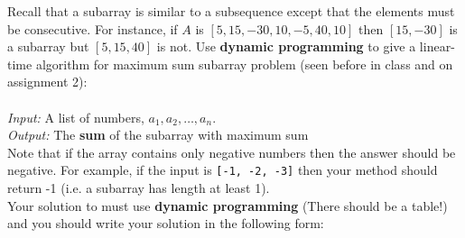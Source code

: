 \documentclass[11pt]{exam}
\begin{document}
\begin{questions}

\question[5]
  Recall that a subarray is similar to a subsequence except that the elements must be consecutive.  For instance, if $A$ is $[5,15,-30,10,-5,40,10]$
  then $[15,-30]$ is a subarray but $[5,15,40]$ is not.  Use {\bf dynamic programming} to give a
  linear-time algorithm for maximum sum subarray problem (seen before in class and on assignment 2):\\\\ 
  \emph{Input:} A list of numbers, $a_1, a_2, \ldots, a_n.$\\ 
  \emph{Output:} The \textbf{sum} of the subarray with maximum sum \\ 
  Note that if the array contains only negative numbers then the answer should be negative.  For example, if the input is \texttt{[-1, -2, -3]} then your method should return -1 (i.e. a subarray has length at least 1).\\

  Your solution to must use \textbf{dynamic programming} (There should be a table!) and you should write your solution in the following form:
\end{questions}
\end{document}
